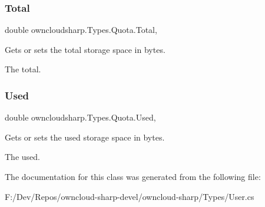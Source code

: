 \subsubsection{\texorpdfstring{Total}{Total}}
{\footnotesize\ttfamily double owncloudsharp.\+Types.\+Quota.\+Total\hspace{0.3cm}{\ttfamily [get]}, {\ttfamily [set]}}



Gets or sets the total storage space in bytes. 

The total.\mbox{\label{classowncloudsharp_1_1_types_1_1_quota_a8f534a14369823baffed8a2f68a47684}} 
\subsubsection{\texorpdfstring{Used}{Used}}
{\footnotesize\ttfamily double owncloudsharp.\+Types.\+Quota.\+Used\hspace{0.3cm}{\ttfamily [get]}, {\ttfamily [set]}}



Gets or sets the used storage space in bytes. 

The used.

The documentation for this class was generated from the following file\+:\begin{DoxyCompactItemize}
\item 
F\+:/\+Dev/\+Repos/owncloud-\/sharp-\/devel/owncloud-\/sharp/\+Types/User.\+cs\end{DoxyCompactItemize}
